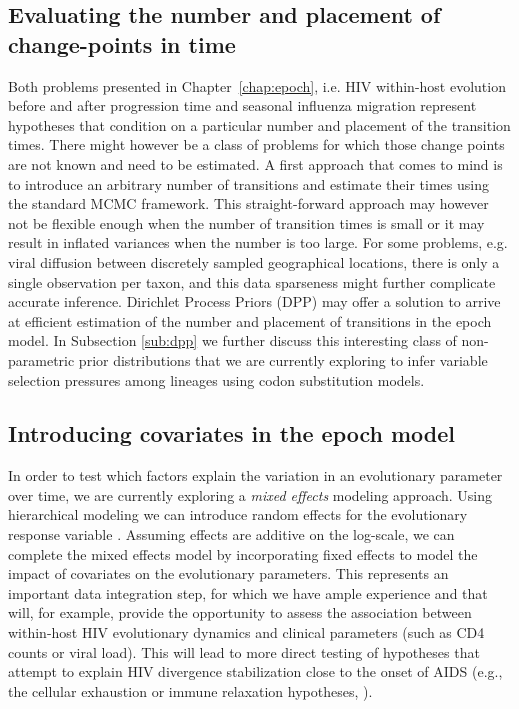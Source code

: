 \subsection{Evaluating the number and placement of change-points in time}

Both problems presented in Chapter~\ref{chap:epoch}, i.e. HIV within-host evolution before and after progression time and seasonal influenza migration represent hypotheses that condition on a particular number and placement of the transition times.
There might however be a class of problems for which those change points are not known and need to be estimated.
A first approach that comes to mind is to introduce an arbitrary number of transitions and estimate their times using the standard MCMC framework.
This straight-forward approach may however not be flexible enough when the number of transition times is small or it may result in
inflated variances when the number is too large. For some problems, e.g. viral diffusion between discretely sampled geographical locations, there is only a single observation per taxon, and this data sparseness might further complicate accurate inference.
Dirichlet Process Priors (DPP) may offer a solution to arrive at efficient estimation of the number and placement of transitions in the epoch model. 
In Subsection \ref{sub:dpp} we further discuss this interesting class of non-parametric prior distributions that we are currently exploring to infer variable selection pressures among lineages using codon substitution models.

\subsection{Introducing covariates in the epoch model}

In order to test which factors explain the variation in an evolutionary parameter over time, we are currently exploring a \emph{mixed effects} modeling approach. Using hierarchical modeling we can introduce random effects for the evolutionary response variable \cite{edomatas11}.
Assuming effects are additive on the log-scale, we can complete the mixed effects model by incorporating fixed effects to model the impact of covariates on the evolutionary parameters. This represents an important data integration step, for which we have ample experience \cite{edomatas11,streicker12,vrancken14} and that will, for example, provide the opportunity to assess the association between within-host HIV evolutionary dynamics and clinical parameters (such as CD4 counts or viral load). This will lead to more direct testing of hypotheses that attempt to explain HIV divergence stabilization close to the onset of AIDS (e.g., the cellular exhaustion or immune relaxation hypotheses, \citep{lemey07}).

